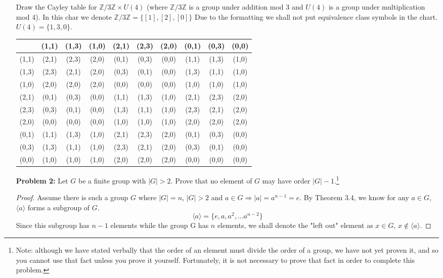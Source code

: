 \documentclass[11pt, oneside]{article}
\newcommand{\Z}{\mathbb Z}
\begin{document}
\begin{enumerate}
Draw the Cayley table for $\Z/3\Z \times U(4)$ (where $\Z/3\Z$ is a group under addition mod 3 and $U(4)$ is a group under multiplication mod 4).
In this char we denote  $\Z/3\Z =\{[1],[2],[0]\}$ Due to the formatting we shall not put equivalence class symbols in the chart. $U(4)= \{1, 3, 0\}$.
\begin{center}
 \begin{tabular}{||c c c c c c c c c c ||} 
 \hline
  & (1,1) & (1,3) & (1,0) & (2,1) & (2,3) & (2,0) & (0,1) & (0,3) & (0,0)\\ [0.5ex] 
 \hline\hline
 (1,1) & (2,1) & (2,3) & (2,0) & (0,1) & (0,3) & (0,0) &(1,1) & (1,3) &(1,0) \\ 
 \hline
 (1,3) & (2,3) & (2,1) & (2,0) & (0,3)& (0,1)&(0,0)&(1,3) &(1,1) &(1,0) \\
 \hline
 (1,0) & (2,0) & (2,0) & (2,0) & (0,0)& (0,0)&(0,0)&(1,0) &(1,0) &(1,0) \\
 \hline
 (2,1) & (0,1) & (0,3) & (0,0) & (1,1)& (1,3)&(1,0)&(2,1) &(2,3) &(2,0) \\
 \hline
 (2,3) & (0,3) & (0,1) & (0,0) & (1,3)& (1,1)&(1,0)&(2,3) &(2,1) &(2,0) \\
 \hline
 (2,0) & (0,0) & (0,0) & (0,0) & (1,0)& (1,0)&(1,0)&(2,0) &(2,0) &(2,0) \\
 \hline
 (0,1) & (1,1) & (1,3) & (1,0) & (2,1)& (2,3)&(2,0)&(0,1) &(0,3) &(0,0) \\
 \hline
 (0,3) & (1,3) & (1,1) & (1,0) & (2,3)& (2,1)&(2,0)&(0,3) &(0,1) &(0,0) \\
 \hline
 (0,0) & (1,0) & (1,0) & (1,0) & (2,0)& (2,0)&(2,0)&(0,0) &(0,0) &(0,0) \\
 \hline
 
\end{tabular}
\end{center}

\newpage

\item[{\bf Problem 2:}] Let $G$ be a finite group with $|G|>2$. Prove that no element of $G$ may have order $|G|-1$.\footnote{Note: although we have stated verbally that the order of an element must divide the order of a group, we have not yet proven it, and so you cannot use that fact unless you prove it yourself. Fortunately, it is not necessary to prove that fact in order to complete this problem.}   

\begin{proof}
Assume there is such a group $G$ where $|G|=n$, $|G|>2$ and $a\in G \Rightarrow{} |a|=a^{n-1}=e$. By Theorem 3.4, we know for any  $a\in G$, $\langle a \rangle$ forms a subgroup of $G$. 
\[\langle a \rangle = \{ e, a, a^2, ... a^{n-2}\} \]
Since this subgroup has $n-1$ elements while the group G has $n$ elements, we shall denote the "left out" element as $x\in G$, $x \notin \langle a \rangle$. 


\end{proof}
\end{enumerate}
\end{document}
